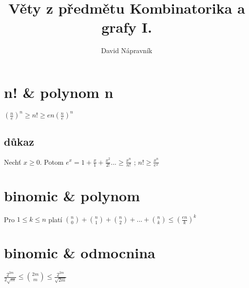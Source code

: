 \documentclass[10pt,a4paper]{article}
\begin{document}
\title{Věty z předmětu Kombinatorika a grafy I.}
\author{David Nápravník}
\maketitle


\tableofcontents
\section{n! \& polynom n}
$
(\frac{n}{e})^n \geq n! \geq en(\frac{n}{e})^n
$
\subsection*{důkaz}
Nechť $x \geq 0$. Potom $e^x = 1 + \frac{x}{1}+\frac{x^2}{2!} ... \geq \frac{x^n}{n!}$ ; $n! \geq \frac{x^n}{e^x}$

\section{binomic \& polynom}
Pro $ 1 \leq k \leq n $ platí
$
\binom{n}{0}+\binom{n}{1}+\binom{n}{2}+...+\binom{n}{k} \leq (\frac{en}{k})^k
$

\section{binomic \& odmocnina}
$
\frac{2^{2m}}{2\sqrt{m}} \leq
\binom{2m}{m} \leq
\frac{2^{2m}}{\sqrt{2m}}
$
\end{document}

